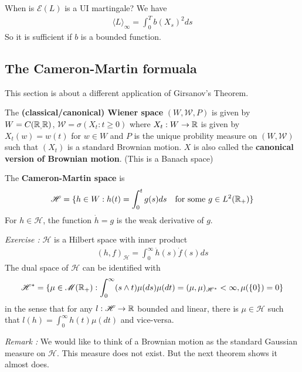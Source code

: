 \documentclass[12pt,a4paper]{article}
\begin{document}
\quad When is $\mathscr{E}(L)$ is a UI martingale? We have
\begin{align*}
\langle L \rangle_{\infty} = \int_0^T b(X_s)^2 ds
\end{align*}
So it is sufficient if $b$ is a bounded function.

\subsection{The Cameron-Martin formuala}

This section is about a different application of Girsanov's Theorem.
\s

 The \textbf{(classical/canonical) Wiener space} $(W,\mathscr{W}, P)$ is given by $W = C(\mathbb{R}_, \mathbb{R})$, $\mathscr{W} = \sigma(X_t : t\geq 0)$ where $X_t : W\rightarrow \mathbb{R}$ is given by $X_t(w) = w(t)$ for $w\in W$ and $P$ is the unique probility measure on $(W, \mathscr{W})$ such that $(X_t)$ is a standard Brownian motion. $X$ is also called the \textbf{canonical version of Brownian motion}. (This is a Banach space)
\s

 The \textbf{Cameron-Martin space} is
\begin{align*}
\mathscr{H} = \{h \in W : h(t) = \int_0^t g(s) ds \quad \text{for some }g\in L^2(\mathbb{R}_+) \}
\end{align*}
For $h\in \mathscr{H}$, the function $\dot{h} =g$ is the weak derivative of $g$.
\s

\emph{Exercise :} $\mathscr{H}$ is a Hilbert space with inner product
\begin{align*}
(h, f)_{\mathscr{H}} = \int_0^{\infty} \dot{h}(s)\dot{f}(s) ds
\end{align*} 
The dual space of $\mathscr{H}$ can be identified with
\begin{align*}
\mathscr{H}^* = \{\mu \in \mathscr{M}(\mathbb{R}_+) : \int_0^{\infty }(s\wedge t)\mu(ds) \mu(dt) = (\mu, \mu)_{\mathscr{H}^*}< \infty, \mu(\{0\})=0\}
\end{align*}
in the sense that for any $l: \mathscr{H} \rightarrow \mathbb{R}$ bounded and linear, there is $\mu \in \mathscr{H}$ such that $l(h) = \int_0^{\infty} h(t) \mu(dt)$ and vice-versa.
\s

\emph{Remark :} We would like to think of a Brownian motion as the standard Gaussian measure on $\mathscr{H}$. This measure does not exist. But the next theorem shows it almost does.
\s
\end{document}
